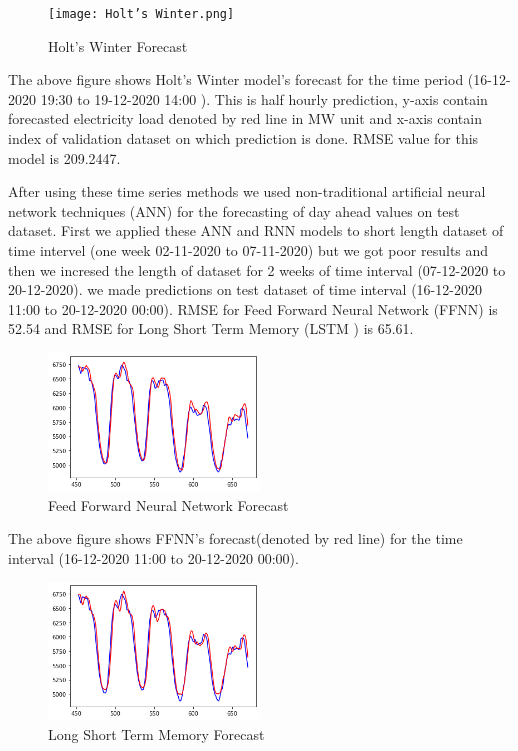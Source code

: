\documentclass{article}
\begin{document}
{{{{\begin{figure}[h]

\centering
\texttt{[image: Holt's Winter.png]}
\caption{\label{fig:my-label} Holt's Winter Forecast}

\end{figure}
                 
                 
                 
The above figure shows Holt's Winter model's forecast for the time period (16-12-2020 19:30 to 19-12-2020 14:00 ). This is half hourly prediction, y-axis contain forecasted electricity load denoted by red line in  MW unit and x-axis contain index of validation dataset on which prediction is done. RMSE value for this model is 209.2447.

After using these time series methods we used non-traditional artificial neural network techniques (ANN) for the forecasting of day ahead values on test dataset. First we applied these ANN and RNN models to short length dataset of time intervel (one week 02-11-2020 to 07-11-2020) but we got poor results and then we incresed the length of dataset for 2 weeks of time interval (07-12-2020 to 20-12-2020). we made predictions on test dataset of time interval (16-12-2020 11:00 to 20-12-2020 00:00). RMSE for Feed Forward Neural Network (FFNN) is 52.54 and RMSE for Long Short Term Memory (LSTM ) is 65.61.


\begin{figure}[h]

\centering
\includegraphics[width = 0.5\textwidth]{FFNN.png}
\caption{\label{fig:my-label} Feed Forward Neural Network Forecast}

\end{figure}

The above figure shows FFNN's forecast(denoted by red line) for the time interval (16-12-2020 11:00 to 20-12-2020 00:00).
\\


\begin{figure}[h]

\centering
\includegraphics[width = 0.5\textwidth]{LSTM_result.png}
\caption{\label{fig:my-label} Long Short Term Memory Forecast}


\end{figure}}}}}
\end{document}
